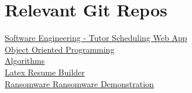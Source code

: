 \begin{minipage}[t]{0.5\textwidth}
    \section*{Relevant Git Repos}
    \begin{small}
        \href{https://github.com/kcverbrugge/tlc-scheduling-app}{Software Engineering - Tutor Scheduling Web App}\\
        \href{https://github.com/kcverbrugge/CSCI375-OOP}{Object Oriented Programming}\\
        \href{https://github.com/kcverbrugge/CSCI250-Algorithms}{Algorithms}\\
        \href{https://github.com/kcverbrugge/ResumeBuilder}{Latex Resume Builder}\\
        \href{https://github.com/kcverbrugge/RansomwareDemonstration}{Ransomware Ransomware Demonstration}
    \end{small}
\end{minipage}